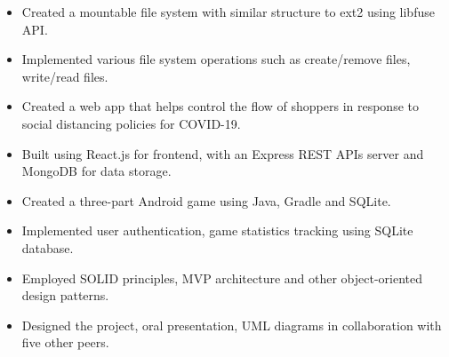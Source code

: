 


\vspace{5pt}

\begin{itemize}
    \item Created a mountable file system with similar structure to ext2 using libfuse API.
    \item Implemented various file system operations such as create/remove files, write/read files.
\end{itemize}

\divider


\vspace{5pt}

\begin{itemize}
	\item Created a web app that helps control the flow of shoppers in response to social distancing policies for COVID-19.
	\item Built using React.js for frontend, with an Express REST APIs server and MongoDB for data storage.
\end{itemize}

\divider


\vspace{5pt}

\begin{itemize}
	\item Created a three-part Android game using Java, Gradle and SQLite.
    \item Implemented user authentication, game statistics tracking using SQLite database.
    \item Employed SOLID principles, MVP architecture and other object-oriented design patterns.
	\item Designed the project, oral presentation, UML diagrams in collaboration with five other peers.
\end{itemize}

\divider


